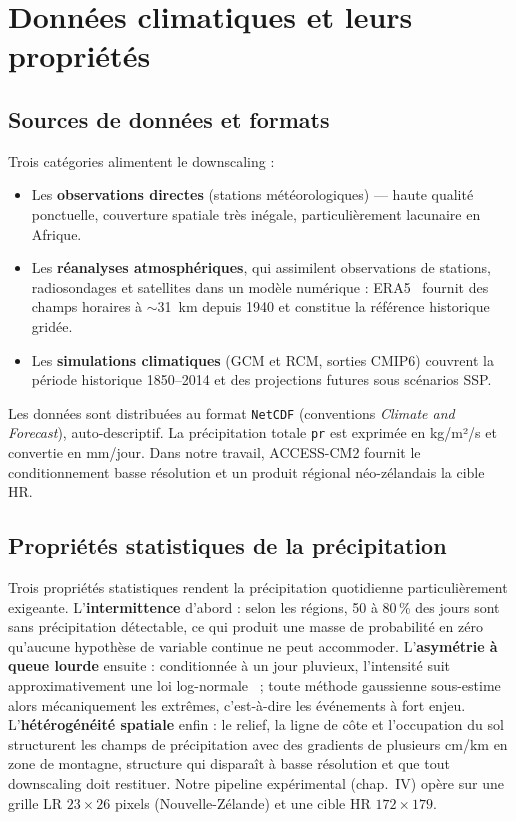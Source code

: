\documentclass[14pt,a4paper,openany]{extreport}
\begin{document}
\section{Données climatiques et leurs propriétés}
\label{sec:donnees}

\subsection{Sources de données et formats}
\label{ssec:sources}

Trois catégories alimentent le downscaling :
\begin{itemize}[leftmargin=1.2em, itemsep=2pt]
    \item Les \textbf{observations directes} (stations météorologiques) --- haute qualité ponctuelle, couverture spatiale très inégale, particulièrement lacunaire en Afrique.
    \item Les \textbf{réanalyses atmosphériques}, qui assimilent observations de stations, radiosondages et satellites dans un modèle numérique : ERA5~\cite{hersbach_era5_2020} fournit des champs horaires à $\sim$31~km depuis 1940 et constitue la référence historique gridée.
    \item Les \textbf{simulations climatiques} (GCM et RCM, sorties CMIP6) couvrent la période historique 1850--2014 et des projections futures sous scénarios SSP.
\end{itemize}

Les données sont distribuées au format \texttt{NetCDF} (conventions \emph{Climate and Forecast}), auto-descriptif. La précipitation totale \texttt{pr} est exprimée en kg/m²/s et convertie en mm/jour. Dans notre travail, ACCESS-CM2 fournit le conditionnement basse résolution et un produit régional néo-zélandais la cible HR.

\subsection{Propriétés statistiques de la précipitation}
\label{ssec:stats-precip}

Trois propriétés statistiques rendent la précipitation quotidienne particulièrement exigeante. L'\textbf{intermittence} d'abord : selon les régions, 50 à 80\,\% des jours sont sans précipitation détectable, ce qui produit une masse de probabilité en zéro qu'aucune hypothèse de variable continue ne peut accommoder. L'\textbf{asymétrie à queue lourde} ensuite : conditionnée à un jour pluvieux, l'intensité suit approximativement une loi log-normale~\cite{maraun_widmann_2018} ; toute méthode gaussienne sous-estime alors mécaniquement les extrêmes, c'est-à-dire les événements à fort enjeu. L'\textbf{hétérogénéité spatiale} enfin : le relief, la ligne de côte et l'occupation du sol structurent les champs de précipitation avec des gradients de plusieurs cm/km en zone de montagne, structure qui disparaît à basse résolution et que tout downscaling doit restituer. Notre pipeline expérimental (chap.~IV) opère sur une grille LR $23 \times 26$ pixels (Nouvelle-Zélande) et une cible HR $172 \times 179$.
\end{document}
